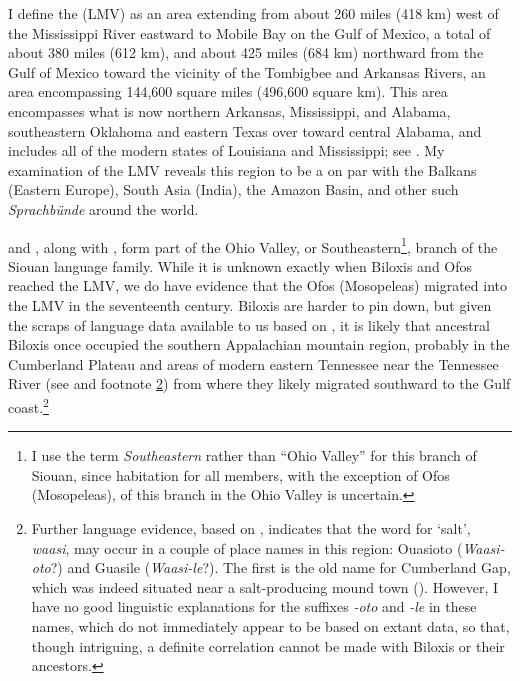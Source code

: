 \documentclass[output=paper]{LSP/langsci}
\begin{document}
I define the  (LMV) as an area extending from about 260 miles (418 km) west of the Mississippi River eastward to Mobile Bay on the Gulf of Mexico, a total of about 380 miles (612 km), and about 425 miles (684 km) northward from the Gulf of Mexico toward the vicinity of the Tombigbee and Arkansas Rivers, an area encompassing 144,600 square miles (496,600 square km). This area encompasses what is now northern Arkansas, Mississippi, and Alabama, southeastern Oklahoma and eastern Texas over toward central Alabama, and includes all of the modern states of Louisiana and Mississippi; see . My examination of the LMV reveals this region to be a  on par with the Balkans (Eastern Europe), South Asia (India), the Amazon Basin, and other such \textit{Sprachbünde} around the world.

 and , along with , form part of the Ohio Valley, or Southeastern\footnote{I use the term \emph{Southeastern} rather than “Ohio Valley” for this branch of Siouan, since habitation for all members, with the exception of Ofos (Mosopeleas), of this branch in the Ohio Valley is uncertain.}, branch of the Siouan language family. While it is unknown exactly when Biloxis and Ofos reached the LMV, we do have evidence that the Ofos (Mosopeleas) migrated into the LMV in the seventeenth century. Biloxis are harder to pin down, but given the scraps of language data available to us based on , it is likely that ancestral Biloxis once occupied the southern Appalachian mountain region, probably in the Cumberland Plateau and areas of modern eastern Tennessee near the Tennessee River (see \citealt{Rankin2011} and footnote \ref{waasi}) from where they likely migrated southward to the Gulf coast.\footnote{\label{waasi}Further language evidence, based on , indicates that the  word for `salt', \emph{waasi}, may occur in a couple of place names in this region: Ouasioto (\emph{Waasi-oto}?) and Guasile (\emph{Waasi-le}?). The first is the old name for Cumberland Gap, which was indeed situated near a salt-producing mound town (\citealt{Meyer1925}). However, I have no good linguistic explanations for the suffixes \emph{-oto} and \emph{-le} in these names, which do not immediately appear to be  based on extant data, so that, though intriguing, a definite correlation cannot be made with Biloxis or their ancestors.}
\end{document}
